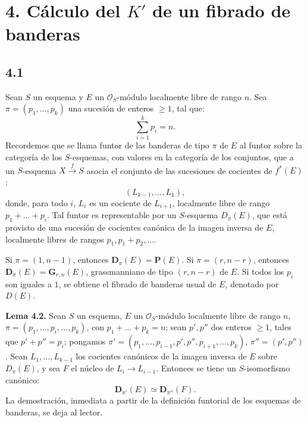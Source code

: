 \providecommand{\sisi}[2]{#2}

\section*{4. Cálculo del \(K'\) de un fibrado de banderas}

\subsection*{4.1}
Sean \(S\) un esquema y \(E\) un \(\mathcal O_S\)-módulo localmente libre de rango \(n\). Sea \(\pi=(p_1,\ldots,p_k)\) una sucesión de enteros \(\geq1\), tal que:
\[
  \sum_{i=1}^k p_i=n.
\]
Recordemos que se llama funtor de las banderas de tipo \(\pi\) de \(E\) al funtor sobre la categoría de los \(S\)-esquemas, con valores en la categoría de los conjuntos, que a un \(S\)-esquema \(X\xrightarrow{f} S\) asocia el conjunto de las sucesiones de cocientes de \(f^*(E)\):
\[
  (L_{k-1},\ldots,L_1),
\]
donde, para todo \(i\), \(L_i\) es un cociente de \(L_{i+1}\), localmente libre de rango \(p_1+\ldots+p_i\). Tal funtor es representable por un \(S\)-esquema \(D_\pi(E)\), que está provisto de una sucesión de cocientes canónica de la imagen inversa de \(E\), localmente libres de rangos \(p_1,p_1+p_2,\ldots\).

Si \(\pi=(1,n-1)\), entonces \(\mathbf D_\pi(E)=\mathbf P(E)\). Si \(\pi=(r,n-r)\), entonces \(\mathbf D_\pi(E)=\mathbf G_{r,n}(E)\), grassmanniano de tipo \((r,n-r)\) de \(E\). Si todos los \(p_i\) son iguales a \(1\), se obtiene el fibrado de banderas usual de \(E\), denotado por \(D(E)\).

\textbf{Lema 4.2.} Sean \(S\) un esquema, \(E\) un \(\mathcal O_S\)-módulo localmente libre de rango \(n\), \(\pi=(p_1,\ldots,p_i,\ldots,p_k)\), con \(p_1+\ldots+p_k=n\); sean \(p',p''\) dos enteros \(\geq1\), tales que \(p'+p''=p_i\); pongamos \(\pi'=(p_1,\ldots,p_{i-1},p',p'',p_{i+1},\ldots,p_k)\), \(\pi''=(p',p'')\). Sean \(L_1,\ldots,L_{k-1}\) los cocientes canónicos de la imagen inversa de \(E\) sobre \(D_\pi(E)\), y sea \(F\) el núcleo de \(L_i\to L_{i-1}\). Entonces se tiene un \(S\)-isomorfismo canónico:
\[
  \mathbf D_{\pi'}(E)\simeq \mathbf D_{\pi''}(F).
\]
La demostración, inmediata a partir de la definición funtorial de los esquemas de banderas, se deja al lector.


